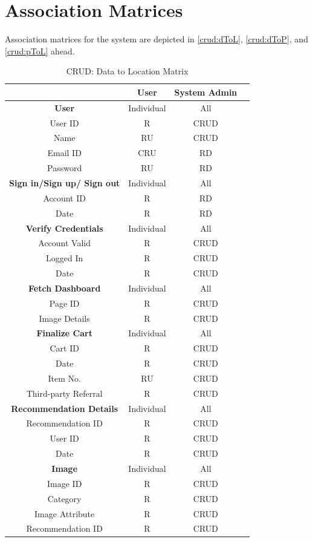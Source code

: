 \section{Association Matrices}
Association matrices for the system are depicted in \autoref{crud:dToL}, \autoref{crud:dToP}, and \autoref{crud:pToL} ahead.  
\begin{table}
\centering
\begin{tabular}{ |c|c|c|c| } 
\hline
 & User & System Admin \\
\hline
\textbf{User} & Individual & All \\ \hline
User ID & R & CRUD \\ 
Name & RU & CRUD \\ 
Email ID & CRU & RD \\
Password & RU & RD \\
\hline
\textbf{Sign in/Sign up/ Sign out} & Individual & All \\ \hline
Account ID & R	& RD \\ 
Date &	R	& RD \\
\hline
\textbf{Verify Credentials} &	Individual	& All \\ \hline
Account Valid &	R &	CRUD \\
Logged In &	R &	CRUD \\
Date &	R &	CRUD \\
\hline
\textbf{Fetch Dashboard} &	Individual &	All \\ \hline
Page ID	& R	& CRUD \\
Image Details &	R &	CRUD\\ \hline
\textbf{Finalize Cart} &	Individual	& All \\ \hline
Cart ID	& R & CRUD \\
Date &	R &	CRUD \\
Item No. &	RU & CRUD \\
Third-party Referral &	R & CRUD \\ \hline
\textbf{Recommendation Details}	& Individual &	All \\ \hline
Recommendation ID &	R &	CRUD \\
User ID	& R & CRUD \\
Date &	R & CRUD \\ \hline
\textbf{Image} &	Individual	& All \\ \hline
Image ID &	R	& CRUD \\
Category & R & CRUD \\
Image Attribute	& R &	CRUD \\
Recommendation ID &	R &	CRUD \\ \hline

\hline
\end{tabular}
\caption{CRUD: Data to Location Matrix}
\label{crud:dToL}
\end{table}
